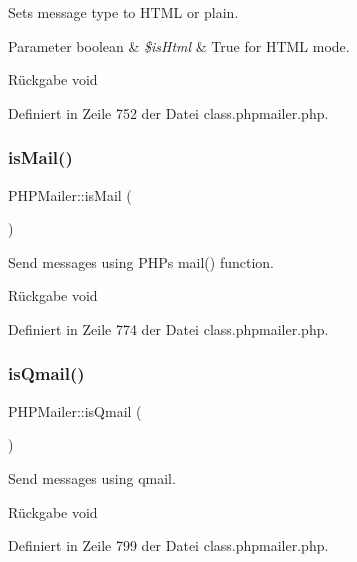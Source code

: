 Sets message type to H\+T\+ML or plain. 
\begin{DoxyParams}[1]{Parameter}
boolean & {\em \$is\+Html} & True for H\+T\+ML mode. \\
\hline
\end{DoxyParams}
\begin{DoxyReturn}{Rückgabe}
void 
\end{DoxyReturn}


Definiert in Zeile 752 der Datei class.\+phpmailer.\+php.

\mbox{\label{class_p_h_p_mailer_a5fb69456c3abfbe88d9a19e7374c6910}} 
\subsubsection{\texorpdfstring{is\+Mail()}{isMail()}}
{\footnotesize\ttfamily P\+H\+P\+Mailer\+::is\+Mail (\begin{DoxyParamCaption}{ }\end{DoxyParamCaption})}

Send messages using P\+HP\textquotesingle{}s mail() function. \begin{DoxyReturn}{Rückgabe}
void 
\end{DoxyReturn}


Definiert in Zeile 774 der Datei class.\+phpmailer.\+php.

\mbox{\label{class_p_h_p_mailer_aa34f0d6e401e7f07a68777c3d8f686ed}} 
\subsubsection{\texorpdfstring{is\+Qmail()}{isQmail()}}
{\footnotesize\ttfamily P\+H\+P\+Mailer\+::is\+Qmail (\begin{DoxyParamCaption}{ }\end{DoxyParamCaption})}

Send messages using qmail. \begin{DoxyReturn}{Rückgabe}
void 
\end{DoxyReturn}


Definiert in Zeile 799 der Datei class.\+phpmailer.\+php.

\mbox{\label{class_p_h_p_mailer_a00833d08b354d38513df87393d79b6c3}} 
